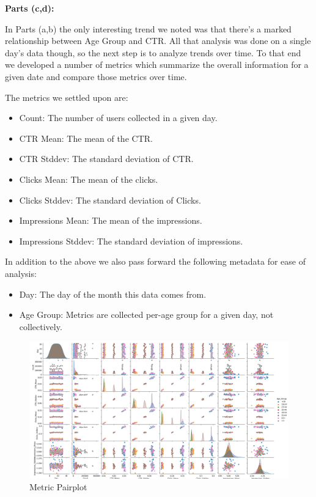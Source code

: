 \documentclass[12pt]{article}
\begin{document}
\begin{enumerate}[leftmargin=\labelsep]
  \textbf{Parts (c,d):}
  
  In Parts (a,b) the only interesting trend we noted was that there's a marked relationship between Age Group and CTR. All that analysis
  was done on a single day's data though, so the next step is to analyze trends over time. To that end we developed a number of metrics which
  summarize the overall information for a given date and compare those metrics over time.
  
  The metrics we settled upon are:
  \begin{itemize}
    \item Count: The number of users collected in a given day.
    \item CTR Mean: The mean of the CTR.
    \item CTR Stddev: The standard deviation of CTR.
    \item Clicks Mean: The mean of the clicks.
    \item Clicks Stddev: The standard deviation of Clicks.
    \item Impressions Mean: The mean of the impressions.
    \item Impressions Stddev: The standard deviation of impressions.
  \end{itemize}

  In addition to the above we also pass forward the following metadata for ease of analysis:

  \begin{itemize}
    \item Day: The day of the month this data comes from.
    \item Age Group: Metrics are collected per-age group for a given day, not collectively.
  \end{itemize}
  
  \begin{figure}[htb]
    \begin{center}
      \includegraphics[width=\textwidth]{media/p1_c_i.png}
    \end{center}
    \caption{Metric Pairplot}
    \label{fig:p1_c_i}
  \end{figure}
  

\end{enumerate}
\end{document}
